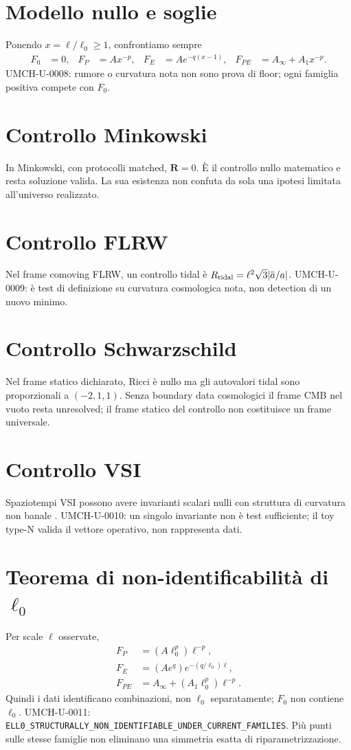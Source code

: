 \documentclass[11pt,a4paper]{article}
\begin{document}
\section{Modello nullo e soglie}\label{sec:u-thresholds}
Ponendo $x=\ell/\ell_0\geq1$, confrontiamo sempre
\begin{align}\label{eq:u-families}
F_0&=0,&F_P&=Ax^{-p},&F_E&=Ae^{-q(x-1)},&F_{PE}&=A_\infty+A_1x^{-p}.
\end{align}
UMCH-U-0008: rumore o curvatura nota non sono prova di floor; ogni famiglia positiva compete con $F_0$.

\section{Controllo Minkowski}\label{sec:u-minkowski}
In Minkowski, con protocolli matched, $\mathbf R=0$. È il controllo nullo matematico e resta soluzione valida. La sua esistenza non confuta da sola una ipotesi limitata all'universo realizzato.

\section{Controllo FLRW}\label{sec:u-flrw}
Nel frame comoving FLRW, un controllo tidal è $R_{\rm tidal}=\ell^2\sqrt3|\ddot a/a|$. UMCH-U-0009: è test di definizione su curvatura cosmologica nota, non detection di un nuovo minimo.

\section{Controllo Schwarzschild}\label{sec:u-schwarzschild}
Nel frame statico dichiarato, Ricci è nullo ma gli autovalori tidal sono proporzionali a $(-2,1,1)$. Senza boundary data cosmologici il frame CMB nel vuoto resta unresolved; il frame statico del controllo non costituisce un frame universale.

\section{Controllo VSI}\label{sec:u-vsi}
Spaziotempi VSI possono avere invarianti scalari nulli con struttura di curvatura non banale \cite{PelavasEtAl2005}. UMCH-U-0010: un singolo invariante non è test sufficiente; il toy type-N valida il vettore operativo, non rappresenta dati.

\section{Teorema di non-identificabilità di $\ell_0$}\label{sec:u-no-go}
Per scale $\ell$ osservate,
\begin{align}\label{eq:u-degeneracy}
F_P&=(A\ell_0^p)\ell^{-p},\\
F_E&=(Ae^q)e^{-(q/\ell_0)\ell},\\
F_{PE}&=A_\infty+(A_1\ell_0^p)\ell^{-p}.
\end{align}
Quindi i dati identificano combinazioni, non $\ell_0$ separatamente; $F_0$ non contiene $\ell_0$. UMCH-U-0011: \verb|ELL0_STRUCTURALLY_NON_IDENTIFIABLE_UNDER_CURRENT_FAMILIES|. Più punti sulle stesse famiglie non eliminano una simmetria esatta di riparametrizzazione.
\end{document}

